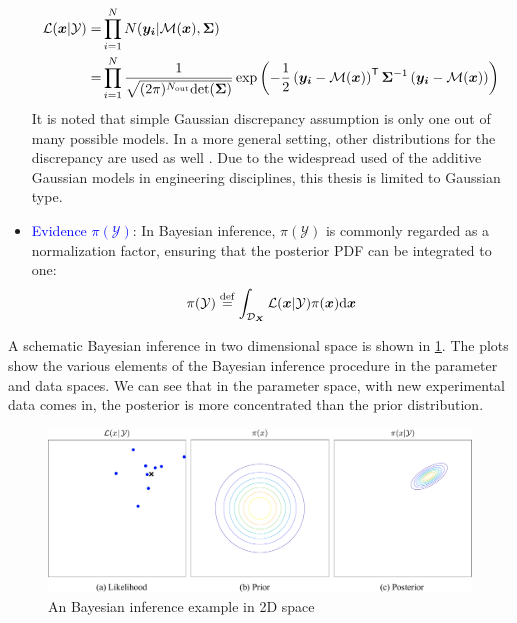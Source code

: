 \begin{itemize}[left=0pt]
\begin{equation}
\begin{aligned}
         \mathcal{L}(\boldsymbol{x}|\mathcal{Y}) =& \prod_{i=1}^{N} N(\boldsymbol{y_{i}}|\mathcal{M}(\boldsymbol{x}),\boldsymbol{\Sigma}) \\
         =& \prod_{i=1}^{N}\frac{1}{\sqrt{(2 \pi)^{N_{\rm{out}}}{\rm{det}} 
         (\boldsymbol{\Sigma})}}\exp\left(-\frac{1}{2}\left(\boldsymbol{y_i} - \mathcal{M}(\boldsymbol{x})\right)^{\mathsf{T}} \boldsymbol{\Sigma}^{-1}\left(\boldsymbol{y_i} - \mathcal{M}(\boldsymbol{x})\right)\right) 
        \end{aligned}
        \end{equation} 
It is noted that simple Gaussian discrepancy assumption is only one out of many possible models. In a more general setting, other distributions for the discrepancy are used as well \citep{UQdoc}. Due to the widespread used of the additive Gaussian models in engineering disciplines, this thesis is limited to Gaussian type. 
    \item \textcolor{blue}{Evidence $\pi(\mathcal{Y})$}: In Bayesian inference, $\pi(\mathcal{Y})$ is commonly regarded as a normalization factor, ensuring that the posterior \acrshort{PDF} can be integrated to one:
\begin{equation}
        \label{eq: evidence}
        \pi(\mathcal{Y}) \stackrel{\rm{def}}{=} \int_{\mathcal{D}_{\boldsymbol{X}}} 
        {\mathcal{L}(\boldsymbol{x}|\mathcal{Y}) \pi(\boldsymbol{x})}
        {\rm{d}} \boldsymbol{x}
    \end{equation}
\end{itemize}

A schematic Bayesian inference in two dimensional space is shown in \cref{fig: BI_2D}. The plots show the various elements of the Bayesian inference procedure in the parameter and data spaces. We can see that in the parameter space, with new experimental data comes in, the posterior is more concentrated than the prior distribution. 
\begin{figure}[htbp]
    \centering
    \includegraphics[width = 140mm]{Figures/figure-BI_2D.pdf}
    \caption{An Bayesian inference example in 2D space}
    \label{fig: BI_2D}
\end{figure}
